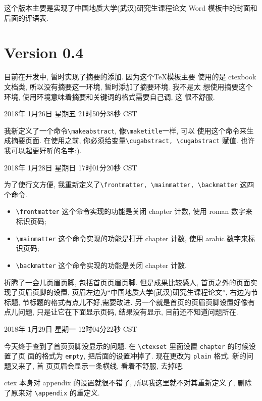 \documentclass{cugrep}
\begin{document}
这个版本主要是实现了中国地质大学(武汉)研究生课程论文 Word 模板中的封面和后面的评语表.
\section{Version 0.4}
\label{sec:version_0_4}

目前在开发中, 暂时实现了摘要的添加. 因为这个\TeX{}模板主要 使用的是
ctexbook 文档类, 所以没有摘要这一环境, 暂时添加了摘要环境. 我不是太
想使用摘要这个环境, 使用环境意味着摘要和关键词的格式需要自己调, 这
很不舒服.

2018年 1月26日 星期五 21时50分38秒 CST

我新定义了一个命令\verb|\makeabstract|, 像\verb|\maketitle|一样, 可以
使用这个命令来生成摘要页面. 在使用之前, 你必须给变量\verb|\cugabstract, \cugabstract| 赋值. 也许我可以起更好听的名字:).

2018年 1月28日 星期日 17时01分20秒 CST

为了使行文方便, 我重新定义了\verb|\frontmatter, \mainmatter, \backmatter| 这四个命令. 

\begin{itemize}
    \item \verb|\frontmatter| 这个命令实现的功能是关闭 chapter 计数, 使用 roman 数字来标识页码;
    \item \verb|\mainmatter| 这个命令实现的功能是打开 chapter 计数, 使用 arabic 数字来标识页码;
    \item \verb|\backmatter| 这个命令实现的功能是关闭 chapter 计数.
\end{itemize}

折腾了一会儿页眉页脚, 包括首页页眉页脚. 但是成果比较感人, 首页之外的页面实现了页眉页脚的设置,
页眉左边为``中国地质大学(武汉)研究生课程论文'', 右边为节标题, 节标题的格式有点儿不好,需要改进.
另一个就是首页的页眉页脚设置好像有点儿问题, 只是让它在下面显示页码, 结果没有显示, 目前还不知道问题所在. 

2018年 1月29日 星期一 12时04分22秒 CST

今天终于查到了首页页脚没显示的问题. 在 \verb|\ctexset| 里面设置 \verb|chapter| 的时候设置了页
面的格式为 \verb|empty|, 把后面的设置冲掉了. 现在更改为 \verb|plain| 格式. 新的问题又来了, 首
页页眉会显示一条横线, 看着不舒服, 去掉吧. 

ctex 本身对 appendix 的设置就很不错了, 所以我这里就不对其重新定义了, 删除了原来对 \verb|\appendix|
的重定义. 
\end{document}
